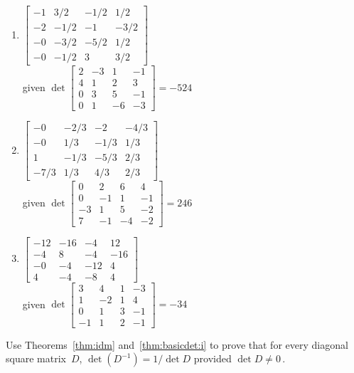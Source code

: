 \begin{exercise}
\begin{enumerate}
\item \(\begin{bmatrix} -1&3/2&-1/2&1/2
\\-2&-1/2&-1&-3/2
\\-0&-3/2&-5/2&1/2
\\-0&-1/2&3&3/2 \end{bmatrix}\)
\\given \(\det\begin{bmatrix} 2&-3&1&-1
\\4&1&2&3
\\0&3&5&-1
\\0&1&-6&-3 \end{bmatrix}= -524 \)

\item \(\begin{bmatrix} -0&-2/3&-2&-4/3
\\-0&1/3&-1/3&1/3
\\1&-1/3&-5/3&2/3
\\-7/3&1/3&4/3&2/3 \end{bmatrix}\)
\\given \(\det\begin{bmatrix} 0&2&6&4
\\0&-1&1&-1
\\-3&1&5&-2
\\7&-1&-4&-2 \end{bmatrix}= 246 \)

\item \(\begin{bmatrix} -12&-16&-4&12
\\-4&8&-4&-16
\\-0&-4&-12&4
\\4&-4&-8&4 \end{bmatrix}\)
\\given \(\det\begin{bmatrix} 3&4&1&-3
\\1&-2&1&4
\\0&1&3&-1
\\-1&1&2&-1 \end{bmatrix}= -34 \)

\end{enumerate}
\end{exercise}




\begin{exercise} \label{ex:default} 
Use Theorems~\ref{thm:idm} and~\ref{thm:basicdet:i} to prove that for every diagonal square matrix~\(D\), \(\det(D^{-1})=1/\det D\) provided \(\det D\neq 0\)\,.
\end{exercise}



